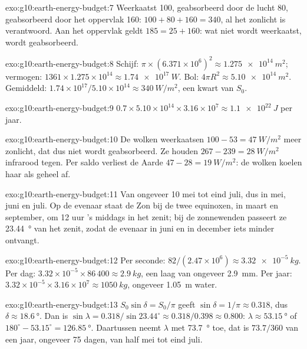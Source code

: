\begin{solution}{exo:g10:earth-energy-budget:7}
Weerkaatst 100, geabsorbeerd door de lucht 80, geabsorbeerd door het oppervlak
160: $100 + 80 + 160 = 340$, al het zonlicht is verantwoord. Aan het oppervlak
geldt $185 = 25 + 160$: wat niet wordt weerkaatst, wordt geabsorbeerd.
\end{solution}

\begin{solution}{exo:g10:earth-energy-budget:8}
Schijf: $\pi \times (6.371\times10^6)^2 \approx \qty{1.275e14}{m^2}$; vermogen:
$1361 \times 1.275\times10^{14} \approx \qty{1.74e17}{W}$. Bol: $4\pi
R^2 \approx \qty{5.10e14}{m^2}$. Gemiddeld: $1.74\times10^{17}/5.10\times
10^{14} \approx \qty{340}{W/m^2}$, een kwart van $S_0$.
\end{solution}

\begin{solution}{exo:g10:earth-energy-budget:9}
$0.7 \times 5.10\times10^{14} \times 3.16\times10^7 \approx
\qty{1.1e22}{J}$ per jaar.
\end{solution}

\begin{solution}{exo:g10:earth-energy-budget:10}
De wolken weerkaatsen $100 - 53 = \qty{47}{W/m^2}$ meer zonlicht, dat dus niet
wordt geabsorbeerd. Ze houden $267 - 239 = \qty{28}{W/m^2}$ infrarood tegen.
Per saldo verliest de Aarde $47 - 28 = \qty{19}{W/m^2}$: de wolken koelen haar
als geheel af.
\end{solution}

\begin{solution}{exo:g10:earth-energy-budget:11}
Van ongeveer 10 mei tot eind juli, dus in mei, juni en juli. Op de evenaar
staat de Zon bij de twee equinoxen, in maart en september, om 12 uur 's middags
in het zenit; bij de zonnewenden passeert ze \qty{23.44}{\degree} van het
zenit, zodat de evenaar in juni en in december iets minder ontvangt.
\end{solution}

\begin{solution}{exo:g10:earth-energy-budget:12}
Per seconde: $82/(2.47\times10^6) \approx \qty{3.32e-5}{kg}$. Per dag:
$3.32\times10^{-5} \times 86\,400 \approx \qty{2.9}{kg}$, een laag van ongeveer
\qty{2.9}{mm}. Per jaar: $3.32\times10^{-5} \times 3.16\times10^7 \approx
\qty{1050}{kg}$, ongeveer \qty{1.05}{m} water.
\end{solution}

\begin{solution}{exo:g10:earth-energy-budget:13}
$S_0 \sin\delta = S_0/\pi$ geeft $\sin\delta = 1/\pi \approx 0.318$, dus
$\delta \approx \qty{18.6}{\degree}$. Dan is $\sin\lambda = 0.318/\sin 23.44^\circ
\approx 0.318/0.398 \approx 0.800$: $\lambda \approx \qty{53.15}{\degree}$ of
$180^\circ - 53.15^\circ = \qty{126.85}{\degree}$. Daartussen neemt $\lambda$
met \qty{73.7}{\degree} toe, dat is $73.7/360$ van een jaar, ongeveer
\num{75} dagen, van half mei tot eind juli.
\end{solution}

